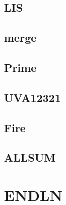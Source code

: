     \subsection{LIS}
        
    \subsection{merge}
          
    \subsection{Prime}
        
    \subsection{UVA12321}
        
    \subsection{Fire}
        
    \subsection{ALLSUM}
        

\section{ENDLN}
    
